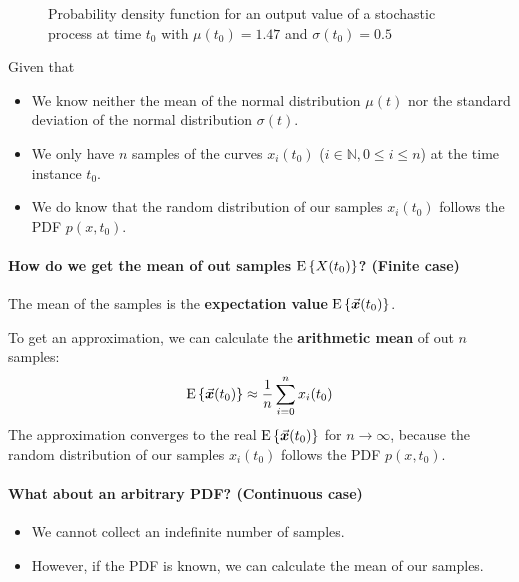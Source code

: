 \begin{refsection}
\begin{figure}[H]
	\caption{Probability density function for an output value of a stochastic process at time $t_0$ with $\mu(t_0) = 1.47$ and $\sigma(t_0) = 0.5$}
\end{figure}

Given that
\begin{itemize}
	\item We know neither the mean of the normal distribution $\mu(t)$ nor the standard deviation of the normal distribution $\sigma(t)$.
	\item We only have $n$ samples of the curves $x_i(t_0)$ ($i \in \mathbb{N}, 0 \leq i \leq n$) at the time instance $t_0$.
	\item We do know that the random distribution of our samples $x_i(t_0)$ follows the \ac{PDF} $p(x, t_0)$.
\end{itemize}

\paragraph{How do we get the mean of out samples $\mathrm{E}\left\{X(t_0)\right\}$? (Finite case)}

The mean of the samples is the  \textbf{expectation value} $\mathrm{E}\left\{\vec{\bm{x}}(t_0)\right\}$. 

To get an approximation, we can calculate the  \textbf{arithmetic mean} of out $n$ samples:
\begin{equation}
	\mathrm{E}\left\{\vec{\bm{x}}(t_0)\right\} \approx \frac{1}{n} \sum\limits_{i = 0}^{n} x_i(t_0)
	\label{eq:ch03:arith_mean}
\end{equation}
The approximation converges to the real $\mathrm{E}\left\{\vec{\bm{x}}(t_0)\right\}$ for $n \rightarrow \infty$, because the random distribution of our samples $x_i(t_0)$ follows the \ac{PDF} $p(x, t_0)$.

\paragraph{What about an arbitrary \ac{PDF}? (Continuous case)}

\begin{itemize}
	\item We cannot collect an indefinite number of samples.
	\item However, if the \ac{PDF} is known, we can calculate the mean of our samples.
\end{itemize}


\end{refsection}
